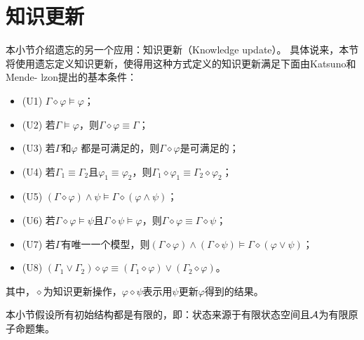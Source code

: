 \section{知识更新}\label{chapter04:sec:update}
本小节介绍遗忘的另一个应用：知识更新（Knowledge update）。
具体说来，本节将使用遗忘定义知识更新，使得用这种方式定义的知识更新满足下面由Katsuno和Mende- lzon提出的基本条件\cite{katsuno91mendelzon}：
\begin{itemize}
	\item (U1)  $\Gamma \diamond \varphi \models \varphi$；
	\item (U2) 若$\Gamma \models \varphi$，则$\Gamma \diamond \varphi \equiv \Gamma$；
	\item (U3) 若$\Gamma$和$\varphi$ 都是可满足的，则$\Gamma \diamond \varphi$是可满足的；
	\item (U4) 若$\Gamma_1\equiv \Gamma_2$且$\varphi_1 \equiv \varphi_2$，则$\Gamma_1 \diamond \varphi_1 \equiv \Gamma_2 \diamond \varphi_2$；
	\item (U5) $(\Gamma \diamond \varphi) \wedge \psi \models \Gamma \diamond(\varphi \wedge \psi)$；
	\item (U6) 若$\Gamma \diamond \varphi \models \psi$且$\Gamma \diamond \psi \models \varphi$，则$\Gamma \diamond \varphi \equiv \Gamma \diamond \psi$；
	\item (U7) 若$\Gamma$有唯一一个模型，则$(\Gamma \diamond \varphi) \wedge (\Gamma \diamond \psi) \models \Gamma \diamond (\varphi \vee \psi)$；
	\item (U8) $(\Gamma_1 \vee \Gamma_2) \diamond \varphi \equiv (\Gamma_1 \diamond \varphi) \vee  (\Gamma_2 \diamond \varphi)$。
\end{itemize}
其中，$\diamond$为知识更新操作，$\varphi \diamond \psi$表示用$\psi$更新$\varphi$得到的结果。

本小节假设所有初始结构都是有限的，即：状态来源于有限状态空间且${\cal A}$为有限原子命题集。

%	


